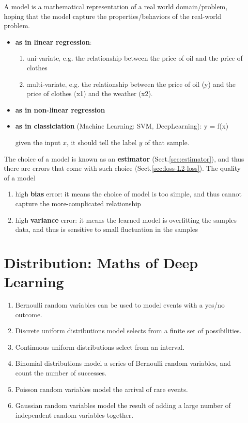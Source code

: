A model is a mathematical representation of a real world domain/problem, hoping
that the model capture the properties/behaviors of the real-world problem. 
\begin{itemize}
  \item {\bf as in linear regression}: 
  \begin{enumerate}
    \item  uni-variate, e.g. the relationship between the price of oil and the price of clothes 
  
    \item multi-variate, e.g. the relationship between the price of oil (y) and the price of clothes (x1) and the weather (x2).
  \end{enumerate}
  
  \item {\bf as in non-linear regression}
  
  \item {\bf as in classiciation} (Machine Learning: SVM, DeepLearning): y = f(x)
  
  given the input $x$, it should tell the label $y$ of that sample.
  
\end{itemize}

The choice of a model is known as an {\bf estimator} (Sect.\ref{sec:estimator}),
and thus there are errors that come with such choice
(Sect.\ref{sec:loss-L2-loss}). The quality of a model 
\begin{enumerate}
  \item high {\bf bias} error: it means the choice of model is too simple, and thus cannot capture the more-complicated relationship 
  
  \item high {\bf variance} error: it means the learned model is overfitting the samples data, and thus is sensitive to small fluctuation in the samples
  
\end{enumerate}

\chapter{Distribution: Maths of Deep Learning}

\begin{enumerate}
  \item  Bernoulli random variables can be used to model events with a yes/no outcome.
  \item  Discrete uniform distributions model selects from a finite set of possibilities.
  \item  Continuous uniform distributions select from an interval.
  \item  Binomial distributions model a series of Bernoulli random variables, and count the number of successes.
  \item  Poisson random variables model the arrival of rare events.
  \item  Gaussian random variables model the result of adding a large number of independent random variables together.
\end{enumerate}


